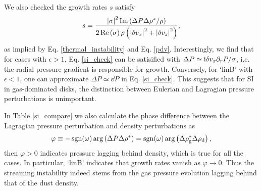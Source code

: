 
We also checked the growth rates $s$ satisfy 
\begin{align} 
  s = \frac{\left|\sigma\right|^2\operatorname{Im}\left(\Delta P
    \Delta\rho^*/\rho\right)}{2\operatorname{Re}\left(\sigma\right)\rho\left(\left|\delta
  v_x\right|^2+\left|\delta
  v_z\right|^2\right)}, \label{si_check}
\end{align}
as implied by Eq. \ref{thermal_instability} and
Eq. \ref{pdv}. %
Interestingly, we find that for cases with
$\epsilon>1$, Eq. \ref{si_check} can be satisified with $\Delta
P\simeq \mathrm{i}\delta v_x \partial_rP/\sigma$, i.e. the radial pressure gradient
is responsible for growth. Conversely, for `linB' with $\epsilon
< 1$, one can approximate $\Delta P \simeq \dd P$ in Eq. \ref{si_check}. This
suggests that for SI in gas-dominated disks, the distinction between
Eulerian and Lagragian pressure perturbations is unimportant. 

In Table \ref{si_compare} we also calculate the phase difference
between the Lagragian pressure perturbation and density perturbations
as    
\begin{align*} 
\varphi \equiv -\operatorname{sgn}(\omega)\arg\left(\Delta P\Delta\rho^*\right)
        = \operatorname{sgn}(\omega)\arg\left(\Delta\rho_\mathrm{g}^*\Delta\rho_\mathrm{d}\right),\notag
\end{align*}
then $\varphi > 0 $ indicates pressure lagging behind density, which
is true for all the cases. In particular, `linB' indicates that growth
rates vanish as $\varphi \to 0$.  
Thus the streaming instability indeed stems  
from the gas pressure evolution lagging behind that of the dust 
density. 




